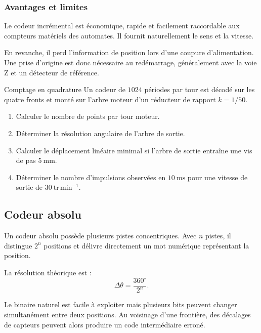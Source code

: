 \subsubsection{Avantages et limites}

Le codeur incrémental est économique, rapide et facilement raccordable aux compteurs matériels des automates. Il fournit naturellement le sens et la vitesse.

En revanche, il perd l'information de position lors d'une coupure d'alimentation. Une prise d'origine est donc nécessaire au redémarrage, généralement avec la voie Z et un détecteur de référence.

\begin{TLLogicApplication}{Comptage en quadrature}
Un codeur de $1024$ périodes par tour est décodé sur les quatre fronts et monté sur l'arbre moteur d'un réducteur de rapport $k=1/50$.
\begin{enumerate}
  \item Calculer le nombre de points par tour moteur.
  \item Déterminer la résolution angulaire de l'arbre de sortie.
  \item Calculer le déplacement linéaire minimal si l'arbre de sortie entraîne une vis de pas $5\ \mathrm{mm}$.
  \item Déterminer le nombre d'impulsions observées en $10\ \mathrm{ms}$ pour une vitesse de sortie de $30\ \mathrm{tr\,min^{-1}}$.
\end{enumerate}
\end{TLLogicApplication}

\subsection{Codeur absolu}

Un codeur absolu possède plusieurs pistes concentriques. Avec $n$ pistes, il distingue $2^n$ positions et délivre directement un mot numérique représentant la position.

\begin{center}\TLCodeurAbsolu\end{center}

La résolution théorique est :
\[
\boxed{\Delta\theta=\frac{360^\circ}{2^n}.}
\]

Le binaire naturel est facile à exploiter mais plusieurs bits peuvent changer simultanément entre deux positions. Au voisinage d'une frontière, des décalages de capteurs peuvent alors produire un code intermédiaire erroné.

